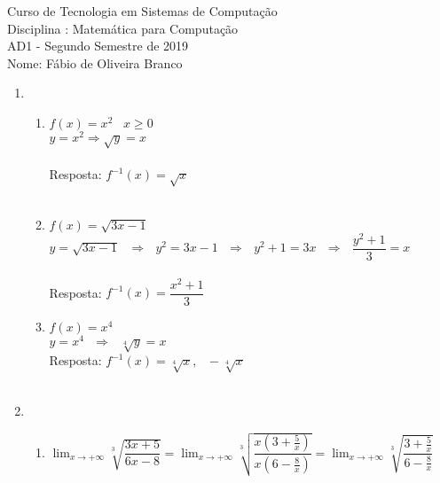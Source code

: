 \documentclass[a4paper, 12pt]{article}
\begin{document}
\begin{center}
Curso de Tecnologia em Sistemas de Computação \\
Disciplina : Matemática para Computação \\
AD1 - Segundo Semestre de 2019 \\
Nome: Fábio de Oliveira Branco\\ 
\end{center}


\begin{enumerate}
\item \begin{enumerate}
	\item  $f(x) = x^2 \,\,\,\,\, x \geq 0$\\
	
	$y = x^2 \Rightarrow \sqrt{y} = x$ \\ \\
	Resposta: $f^{-1}(x) = \sqrt{x}$ \\ \\
	
	\item $f(x) = \sqrt{3x - 1}$ \\
	
	$y  = \sqrt{3x - 1} \,\,\,\, \Rightarrow \,\,\,\, y^2 = 3x - 1 \,\,\,\, \Rightarrow  \,\,\,\, y^2 + 1 = 3x \,\,\,\, \Rightarrow \,\,\,\, \dfrac{y^2 + 1}{3} = x$ \\ \\
	Resposta: $f^{-1}(x) = \dfrac{x^2 + 1}{3}$\\
	
	\item $f(x) = x^4$ \\
	
	$y = x^4 \,\,\,\, \Rightarrow \,\,\,\, \sqrt[4]{y} = x$ \\ 
	
	Resposta: $f^{-1}(x) = \sqrt[4]{x}, \,\,\,\, -\sqrt[4]{x}$ \\ \\
\end{enumerate}

\item \begin{enumerate}
	\item $\displaystyle{\lim_{x\to+\infty} \sqrt[3]{\dfrac{3x + 5}{6x - 8}}} = \displaystyle{\lim_{x\to+\infty} \sqrt[3]{\dfrac{x(3 +\frac{5}{x})}{x(6 - \frac{8}{x})}}} = 		\displaystyle{\lim_{x\to+\infty} \sqrt[3]{\dfrac{3 +\frac{5}{x}}{6 - \frac{8}{x}}}}$ \\ \\
	

\end{enumerate}
\end{enumerate}
\end{document}
